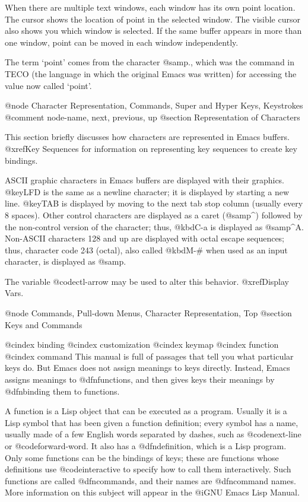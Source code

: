 {{  When there are multiple text windows, each window has its own point
location.  The cursor shows the location of point in the selected
window.  The visible cursor also shows you which window is selected.  If
the same buffer appears in more than one window, point can be moved in
each window independently.

  The term `point' comes from the character @samp{.}, which was the
command in TECO (the language in which the original Emacs was written)
for accessing the value now called `point'.

@node Character Representation, Commands, Super and Hyper Keys, Keystrokes
@comment  node-name,  next,  previous,  up
@section Representation of Characters

This section briefly discusses how characters are represented in Emacs
buffers.  @xref{Key Sequences} for information on representing key
sequences to create key bindings. 

  ASCII graphic characters in Emacs buffers are displayed with their
graphics.  @key{LFD} is the same as a newline character; it is displayed
by starting a new line.  @key{TAB} is displayed by moving to the next
tab stop column (usually every 8 spaces).  Other control characters are
displayed as a caret (@samp{^}) followed by the non-control version of
the character; thus, @kbd{C-a} is displayed as @samp{^A}.  Non-ASCII
characters 128 and up are displayed with octal escape sequences; thus,
character code 243 (octal), also called @kbd{M-#} when used as an input
character, is displayed as @samp{}.

The variable @code{ctl-arrow} may be used to alter this behavior.
@xref{Display Vars}.

@node Commands, Pull-down Menus, Character Representation, Top
@section Keys and Commands

@cindex binding
@cindex customization
@cindex keymap
@cindex function
@cindex command
  This manual is full of passages that tell you what particular keys do.
But Emacs does not assign meanings to keys directly.  Instead, Emacs
assigns meanings to @dfn{functions}, and then gives keys their meanings
by @dfn{binding} them to functions.

 A function is a Lisp object that can be executed as a program.  Usually
it is a Lisp symbol that has been given a function definition; every
symbol has a name, usually made of a few English words separated by
dashes, such as @code{next-line} or @code{forward-word}.  It also has a
@dfn{definition}, which is a Lisp program.  Only some functions can be the
bindings of keys; these are functions whose definitions use
@code{interactive} to specify how to call them interactively.  Such
functions are called @dfn{commands}, and their names are @dfn{command
names}.  More information on this subject will appear in the @i{GNU
Emacs Lisp Manual}.

}}
